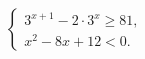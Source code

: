 \begin{ex}
	\begin{condition}
	\( \left\{
	\begin{array}{l}
		3^{x+1}-2\cdot3^x\geq81,\\
		x^2-8x+12<0.
	\end{array}
	\right. \)
	\end{condition}
	\answer{\( [4;6) \)}
\end{ex}